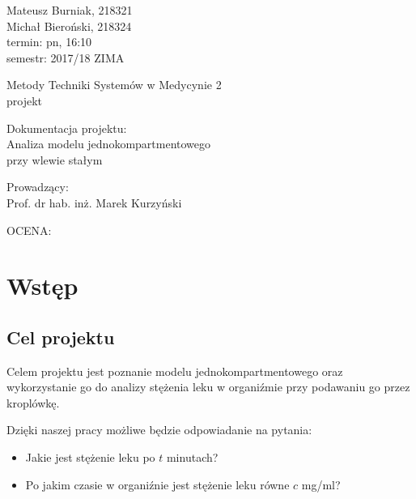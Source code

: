 \documentclass[12pt]{article}
\begin{document}
\thispagestyle{empty}

\noindent
Mateusz Burniak, 218321 \\
Michał Bieroński, 218324 \\

\noindent
termin: pn, 16:10 \\
semestr: 2017/18 ZIMA

\vfill

\begin{center}
  \begin{Huge}
    Metody Techniki Systemów w Medycynie 2 \\
    \vspace{.5cm}
    projekt
  \end{Huge}
  
  \vspace{3cm}
  
  \begin{Large}
    Dokumentacja projektu: \\
    Analiza modelu jednokompartmentowego \\
    przy wlewie stałym
  \end{Large}
  
  \vspace{3cm}
  
  \begin{Large}
    Prowadzący: \\
Prof. dr hab. inż. Marek Kurzyński
  \end{Large}
  
  \vspace{3cm}
  
\end{center}

\vfill

OCENA:

\newpage

\section{Wstęp}

\subsection{Cel projektu}

Celem projektu jest poznanie modelu jednokompartmentowego oraz wykorzystanie go do analizy stężenia leku w organiźmie przy podawaniu go przez kroplówkę.

Dzięki naszej pracy możliwe będzie odpowiadanie na pytania:
\begin{itemize}
\item Jakie jest stężenie leku po $t$ minutach?
\item Po jakim czasie w organiźnie jest stężenie leku równe $c$ mg/ml?
\end{itemize}
\end{document}
